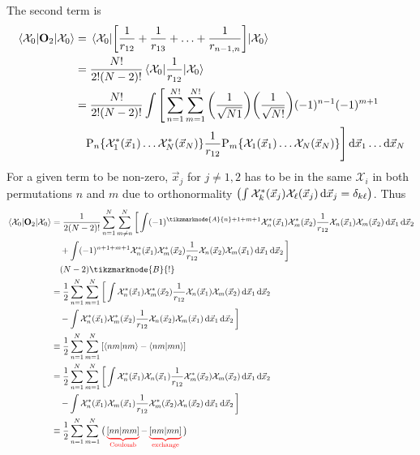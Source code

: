\documentclass[12pt,a4paper,titlepage]{article}
\newcommand{\trm}[1]{\textrm{#1}} %
\newcommand{\Chi}{\mathcal{X}} %
\newcommand{\perm}{\trm{P}} %
\begin{document}
The second term is
\begin{equation}
\begin{aligned}
\mel{\Chi_{0}}{\vb{O}_{2}}{\Chi_{0}}&=\mel{\Chi_{0}}{\qty[\frac{1}{r_{12}}+\frac{1}{r_{13}}+\ldots+\frac{1}{r_{n-1,n}}]}{\Chi_{0}}\\
&=\frac{N!}{2!(N-2)!}\mel{\Chi_{0}}{\frac{1}{r_{12}}}{\Chi_{0}}\\
&=\frac{N!}{2!(N-2)!}\int\Bigg[\sum_{n=1}^{N!}\sum_{m=1}^{N!}\qty(\frac{1}{\sqrt{N1}})\qty(\frac{1}{\sqrt{N!}})(-1)^{n-1}(-1)^{m+1}\\
&\quad\perm_{n}\{\Chi_{1}^{*}(\vec{x}_{1})\ldots\Chi_{N}^{*}(\vec{x}_{N})\}\frac{1}{r_{12}}\perm_{m}\{\Chi_{1}(\vec{x}_{1})\ldots\Chi_{N}(\vec{x}_{N})\}\Bigg]\dd{\vec{x}_{1}}\ldots\dd{\vec{x}_{N}}
\end{aligned}
\end{equation}
For a given term to be non-zero, $\vec{x}_{j}$ for $j\neq1,2$ has to be in the same $\Chi_{i}$ in both permutations $n$ and $m$ due to orthonormality $\qty(\int\Chi_{k}^{*}(\vec{x}_{j})\Chi_{\ell}(\vec{x}_{j})\dd{\vec{x}_{j}}=\delta_{k\ell})$. Thus
\begin{equation}
\begin{aligned}
\mel{\Chi_{0}}{\vb{O}_{2}}{\Chi_{0}}&=\frac{1}{2(N-2)!}\sum_{n=1}^{N}\sum_{m\neq n}^{N}\bigg[\int(-1)^{\tikzmarknode{A}{n}+1+m+1}\Chi_{n}^{*}(\vec{x}_{1})\Chi_{m}^{*}(\vec{x}_{2})\frac{1}{r_{12}}\Chi_{n}(\vec{x}_{1})\Chi_{m}(\vec{x}_{2})\dd{\vec{x}_{1}}\dd{\vec{x}_{2}}\\
&\quad+\int(-1)^{n+1+m+1}\Chi_{n}^{*}(\vec{x}_{1})\Chi_{m}^{*}(\vec{x}_{2})\frac{1}{r_{12}}\Chi_{n}(\vec{x}_{2})\Chi_{m}(\vec{x}_{1})\dd{\vec{x}_{1}}\dd{\vec{x}_{2}}\bigg]\\
&\quad(N-2)\tikzmarknode{B}{!}\\
&=\frac{1}{2}\sum_{n=1}^{N}\sum_{m=1}^{N}\bigg[\int\Chi_{n}^{*}(\vec{x}_{1})\Chi_{m}^{*}(\vec{x}_{2})\frac{1}{r_{12}}\Chi_{n}(\vec{x}_{1})\Chi_{m}(\vec{x}_{2})\dd{\vec{x}_{1}}\dd{\vec{x}_{2}}\\
&\quad-\int\Chi_{n}^{*}(\vec{x}_{1})\Chi_{m}^{*}(\vec{x}_{2})\frac{1}{r_{12}}\Chi_{n}(\vec{x}_{2})\Chi_{m}(\vec{x}_{1})\dd{\vec{x}_{1}}\dd{\vec{x}_{2}}\bigg]\\
&\equiv\frac{1}{2}\sum_{n=1}^{N}\sum_{m=1}^{N}\qty[\ip{nm}{nm}-\ip{nm}{mn}]\\
&=\frac{1}{2}\sum_{n=1}^{N}\sum_{m=1}^{N}\bigg[\int\Chi_{n}^{*}(\vec{x}_{1})\Chi_{n}(\vec{x}_{1})\frac{1}{r_{12}}\Chi_{m}^{*}(\vec{x}_{2})\Chi_{m}(\vec{x}_{2})\dd{\vec{x}_{1}}\dd{\vec{x}_{2}}\\
&\quad-\int\Chi_{n}^{*}(\vec{x}_{1})\Chi_{m}(\vec{x}_{1})\frac{1}{r_{12}}\Chi_{m}^{*}(\vec{x}_{2})\Chi_{n}(\vec{x}_{2})\dd{\vec{x}_{1}}\dd{\vec{x}_{2}}\bigg]\\
&\equiv\frac{1}{2}\sum_{n=1}^{N}\sum_{m=1}^{N}\big(\color{red}\underbrace{\color{black}[nn|mm]}_{\trm{Coulomb}}{\color{black}-}\underbrace{\color{black}[nm|mn]}_{\trm{exchange}}\color{black}\big)
\end{aligned}
\end{equation}
\end{document}
